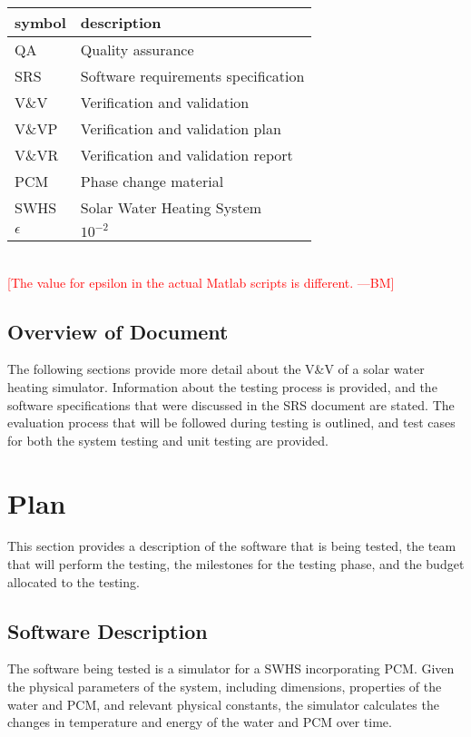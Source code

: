 \documentclass[12pt]{article}
\newcommand{\authornote}[3]{\textcolor{#1}{[#3 ---#2]}}
\newcommand{\authornote}[3]{}
\newcommand{\bmac}[1]{\authornote{red}{BM}{#1}}
\begin{document}
\renewcommand{\arraystretch}{1.2}
\begin{tabular}{l l} 
  \toprule		
  \textbf{symbol} & \textbf{description}\\
  \midrule 
  QA		&Quality assurance\\
  SRS		&Software requirements specification\\
  V\&V		& Verification and validation\\
  V\&VP 	& Verification and validation plan\\
  V\&VR 	& Verification and validation report\\
  PCM		& Phase change material\\
  SWHS		& Solar Water Heating System\\
  $\epsilon$& $10^{-2}$\\
  \bottomrule
\end{tabular}\\

\bmac{The value for epsilon in the actual Matlab scripts is different.}

\subsection{Overview of Document }
The following sections provide more detail about the V\&V of a solar water heating
 simulator. Information about the testing process is provided, and the software specifications
that were discussed in the SRS document are stated.  The evaluation process that will be followed during 
testing is outlined, and test cases for both the system testing and unit testing are provided.

%
%

\section{Plan}
This section provides a description of the software that is being tested, the team that will
perform the testing, the milestones for the testing phase, and the budget allocated to the testing. 

\subsection{Software Description}
The software being tested is a simulator for a SWHS
incorporating PCM. Given the physical parameters of the system,
 including dimensions, properties of the water and PCM, and relevant physical constants,
  the simulator calculates the changes in temperature and energy of the water and PCM 
  over time.
\end{document}
